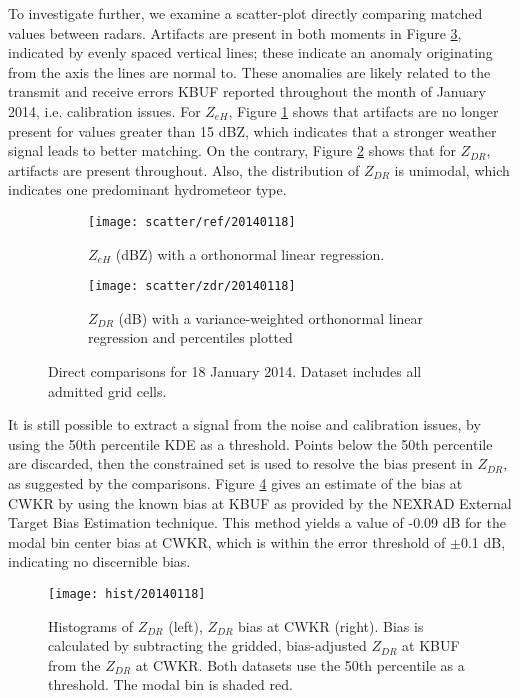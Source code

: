 To investigate further, we examine a scatter-plot directly comparing matched values between radars.
Artifacts are present in both moments in Figure
\ref{fig:scatter_20140118}, indicated by evenly spaced vertical lines; these indicate an anomaly
originating from the axis the lines are normal to. These anomalies are likely related to the transmit and receive errors KBUF reported throughout the month of January 2014, i.e. calibration issues. For
$Z_{eH}$, Figure \ref{fig:scatter_ref_20140118} shows that artifacts are no longer present for values
greater than 15 dBZ, which indicates that a
stronger weather signal leads to better matching. On the contrary, Figure \ref{fig:scatter_zdr_20140118}
shows that for $Z_{DR}$, artifacts are present throughout. Also, the distribution of $Z_{DR}$ is unimodal, which indicates one predominant hydrometeor type. 
\begin{figure}[H]
\centering
   \begin{subfigure}[t]{0.48\linewidth}
     \texttt{[image: scatter/ref/20140118]}
     \caption{$Z_{eH}$ (dBZ) with a orthonormal linear regression.}\label{fig:scatter_ref_20140118}
   \end{subfigure}
   \begin{subfigure}[t]{0.48\linewidth}
     \texttt{[image: scatter/zdr/20140118]}
     \caption{$Z_{DR}$ (dB) with a variance-weighted orthonormal linear regression and percentiles plotted}\label{fig:scatter_zdr_20140118}
   \end{subfigure}
\caption{Direct comparisons for 18 January 2014. Dataset includes all admitted grid cells.} \label{fig:scatter_20140118}
\end{figure}

It is still possible to extract a signal from the noise and calibration issues, by using the 50th percentile KDE as a threshold. Points below the 50th percentile are discarded, then the constrained set is used to resolve the bias present in
$Z_{DR}$, as suggested by the comparisons. Figure \ref{fig:hist_20140118} gives an estimate of the
bias at CWKR by using the known bias at KBUF as provided by the NEXRAD
External Target Bias Estimation technique. This method yields a value of -0.09 dB for the modal bin center bias at CWKR, which is within the error threshold of $\pm$0.1 dB, indicating no discernible bias.

\begin{figure}[H]
\texttt{[image: hist/20140118]}\centering
\caption{Histograms of $Z_{DR}$ (left), $Z_{DR}$ bias at CWKR (right). Bias is calculated by subtracting the gridded, bias-adjusted $Z_{DR}$ at KBUF from the
$Z_{DR}$ at CWKR. Both datasets use the 50th percentile as a threshold. The modal bin is shaded red.} 
\label{fig:hist_20140118}
\end{figure}



